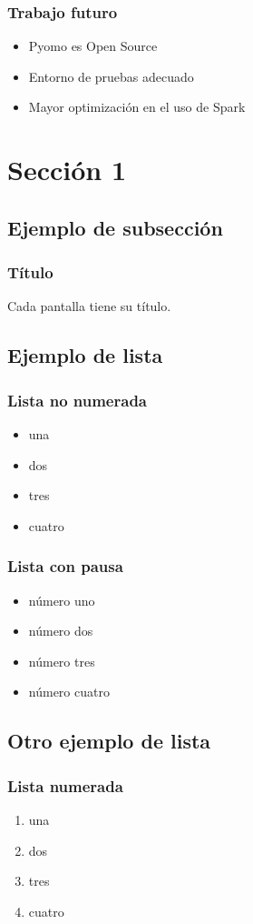 \documentclass{beamer}
\begin{document}
\begin{frame}{}
    \frametitle{Trabajo futuro}
    \begin{itemize}
        \item Pyomo es Open Source \pause
        \item Entorno de pruebas adecuado
        \item Mayor optimización en el uso de Spark
    \end{itemize}
\end{frame}

\iffalse

\section{Sección 1} 
\subsection{Ejemplo de subsección}
\begin{frame}
\frametitle{Título} 
Cada pantalla tiene su título.
\end{frame}

\subsection{Ejemplo de lista}

\begin{frame}
\frametitle{Lista no numerada}
\begin{itemize}
\item una  
\item dos 
\item tres 
\item cuatro
\end{itemize} 
\end{frame}

\begin{frame}
\frametitle{Lista con pausa}
\begin{itemize}
\item número uno \pause 
\item número dos \pause 
\item número tres \pause 
\item número cuatro
\end{itemize} 
\end{frame}

\subsection{Otro ejemplo de lista}
\begin{frame}
\frametitle{Lista numerada}
\begin{enumerate}
\item una  
\item dos 
\item tres 
\item cuatro
\end{enumerate}
\end{frame}
\end{document}
